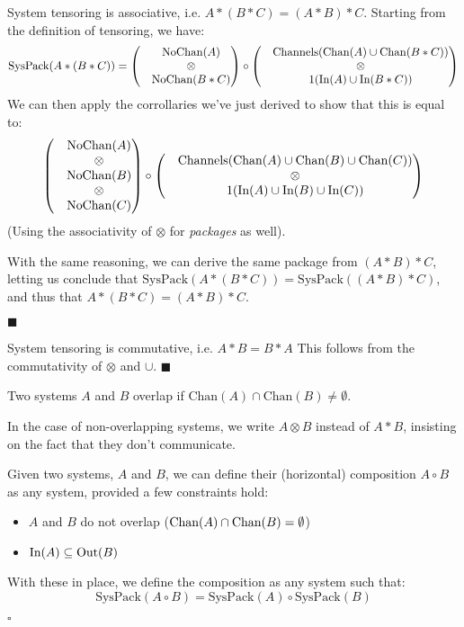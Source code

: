 \begin{lemma}
System tensoring is associative, i.e. $A * (B * C) = (A * B) * C$.
 Starting from the definition of tensoring, we have:
$$
\text{SysPack}(A * (B * C)) =
\begin{pmatrix}
&\text{NoChan}(A)\cr
&\otimes\cr
&\text{NoChan}(B * C)\cr
\end{pmatrix}
\circ
\begin{pmatrix}
&\text{Channels}(\text{Chan}(A) \cup \text{Chan}(B * C))\cr
&\otimes\cr
&1(\text{In}(A) \cup \text{In}(B * C))\cr
\end{pmatrix}
$$
We can then apply the corrollaries we've just derived to show that this
is equal to:
$$
\begin{pmatrix}
&\text{NoChan}(A)\cr
&\otimes\cr
&\text{NoChan}(B)\cr
&\otimes\cr
&\text{NoChan}(C)\cr
\end{pmatrix}
\circ
\begin{pmatrix}
  &\text{Channels}(\text{Chan}(A) \cup \text{Chan}(B) \cup \text{Chan}(C))\cr
&\otimes\cr
  &1(\text{In}(A) \cup \text{In}(B) \cup \text{In}(C))\cr
\end{pmatrix}
$$
(Using the associativity of $\otimes$ for \emph{packages} as well).

With the same reasoning, we can derive the same package from $(A * B) * C$,
letting us conclude that $\text{SysPack}(A * (B * C)) = \text{SysPack}((A * B) * C)$,
and thus that $A * (B * C) = (A * B) * C$.

$\blacksquare$
\end{lemma}

\begin{lemma}
System tensoring is commutative, i.e. $A * B = B * A$
 This follows from the commutativity of $\otimes$ and $\cup$.
$\blacksquare$
\end{lemma}

\begin{definition}
Two systems $A$ and $B$ overlap if $\text{Chan}(A) \cap \text{Chan}(B) \neq \emptyset$.

In the case of non-overlapping systems, we write $A \otimes B$ instead of $A * B$,
insisting on the fact that they don't communicate.
\end{definition}

\begin{definition}
Given two systems, $A$ and $B$, we can define their (horizontal) composition
$A \circ B$ as any system, provided a few constraints hold:
\begin{itemize}
\item $A$ and $B$ do not overlap ($\text{Chan}(A) \cap \text{Chan}(B) = \emptyset$)
\item $\text{In}(A) \subseteq \text{Out}(B)$
\end{itemize}

With these in place, we define the composition as any system such that:
$$
\text{SysPack}(A \circ B) =
\text{SysPack}(A) \circ \text{SysPack}(B)
$$

$\square$
\end{definition}

